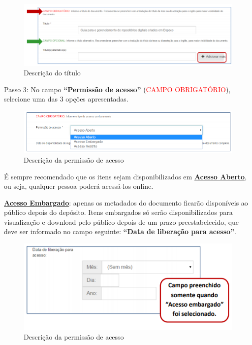 \documentclass[12pt,hidelinks]{article}
\begin{document}
    \begin{figure}[!htp]
                \centering
                \includegraphics[scale=0.7]{figura/Figura137.png}
                \caption{Descrição do título}
            \label{Rotulo}
        \end{figure}
 
\newpage

    Passo 3: No campo \textbf{“Permissão de acesso”} (\textcolor{red}{CAMPO OBRIGATÓRIO}), selecione uma das 3 opções apresentadas. 

    \begin{figure}[!htp]
                \centering
                \includegraphics[scale=0.7]{figura/Figura138.png}
                \caption{Descrição da permissão de acesso}
            \label{Rotulo}
        \end{figure}
    
    É sempre recomendado que os itens sejam disponibilizados em \textbf{\underline{Acesso Aberto}}, ou seja, qualquer pessoa poderá acessá-los online.
    
    \singlespacing
    
    \textbf{\underline{Acesso Embargado}}: apenas os metadados do documento ficarão disponíveis ao público depois do depósito. Itens embargados só serão disponibilizados para visualização e download pelo público depois de um prazo preestabelecido, que deve ser informado no campo seguinte: \textbf{“Data de liberação para acesso”}.
    
    \begin{figure}[!htp]
                \centering
                \includegraphics[scale=0.8]{figura/Figura139.png}
                \caption{Descrição da permissão de acesso}
            \label{Rotulo}
        \end{figure}
    
\end{document}
